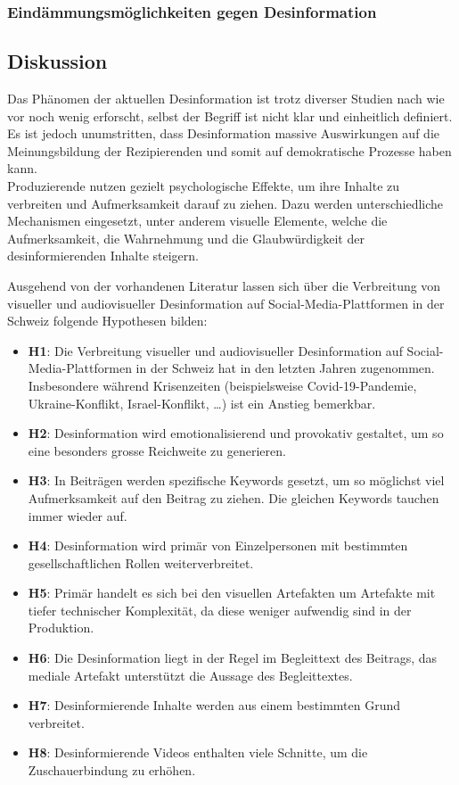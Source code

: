 \documentclass[12pt,a4paper]{article}        %
\begin{document}
\subsubsection{Eindämmungsmöglichkeiten gegen Desinformation}
\subsection{Diskussion}
Das Phänomen der aktuellen Desinformation ist trotz diverser Studien nach wie vor noch wenig erforscht, selbst der Begriff ist nicht klar und einheitlich definiert. Es ist jedoch unumstritten, dass Desinformation massive Auswirkungen auf die Meinungsbildung der Rezipierenden und somit auf demokratische Prozesse haben kann. \\
Produzierende nutzen gezielt psychologische Effekte, um ihre Inhalte zu verbreiten und Aufmerksamkeit darauf zu ziehen. Dazu werden unterschiedliche Mechanismen eingesetzt, unter anderem visuelle Elemente, welche die Aufmerksamkeit, die Wahrnehmung und die Glaubwürdigkeit der desinformierenden Inhalte steigern.

Ausgehend von der vorhandenen Literatur lassen sich über die Verbreitung von visueller und audiovisueller Desinformation auf Social-Media-Plattformen in der Schweiz folgende Hypothesen bilden:
\begin{itemize}
  \item \textbf{H1}: Die Verbreitung visueller und audiovisueller Desinformation auf Social-Media-Plattformen in der Schweiz hat in den letzten Jahren zugenommen. Insbesondere während Krisenzeiten (beispielsweise Covid-19-Pandemie, Ukraine-Konflikt, Israel-Konflikt, …) ist ein Anstieg bemerkbar.
  \item \textbf{H2}: Desinformation wird emotionalisierend und provokativ gestaltet, um so eine besonders grosse Reichweite zu generieren.
  \item \textbf{H3}:  In Beiträgen werden spezifische Keywords gesetzt, um so möglichst viel Aufmerksamkeit auf den Beitrag zu ziehen. Die gleichen Keywords tauchen immer wieder auf.
  \item \textbf{H4}:  Desinformation wird primär von Einzelpersonen mit bestimmten gesellschaftlichen Rollen weiterverbreitet.
  \item \textbf{H5}:  Primär handelt es sich bei den visuellen Artefakten um Artefakte mit tiefer technischer Komplexität, da diese weniger aufwendig sind in der Produktion.
  \item \textbf{H6}:  Die Desinformation liegt in der Regel im Begleittext des Beitrags, das mediale Artefakt unterstützt die Aussage des Begleittextes.
  \item \textbf{H7}:  Desinformierende Inhalte werden aus einem bestimmten Grund verbreitet.
  \item \textbf{H8}:  Desinformierende Videos enthalten viele Schnitte, um die Zuschauerbindung zu erhöhen.
\end{itemize}
\end{document}
